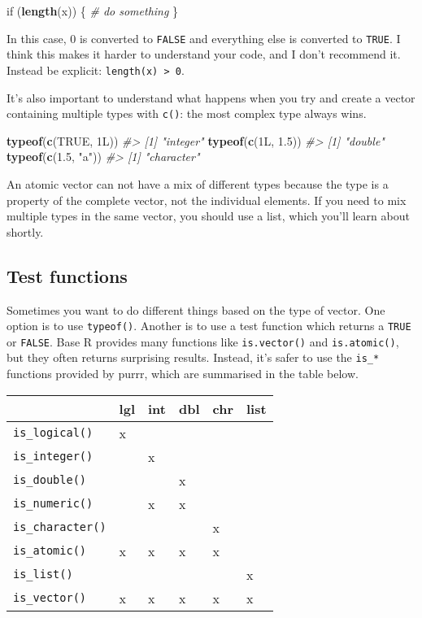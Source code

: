 \documentclass[]{book}
\newenvironment{Shaded}{\begin{snugshade}}{\end{snugshade}}
\newcommand{\KeywordTok}[1]{\textcolor[rgb]{0.13,0.29,0.53}{\textbf{{#1}}}}
\newcommand{\FloatTok}[1]{\textcolor[rgb]{0.00,0.00,0.81}{{#1}}}
\newcommand{\StringTok}[1]{\textcolor[rgb]{0.31,0.60,0.02}{{#1}}}
\newcommand{\CommentTok}[1]{\textcolor[rgb]{0.56,0.35,0.01}{\textit{{#1}}}}
\newcommand{\OtherTok}[1]{\textcolor[rgb]{0.56,0.35,0.01}{{#1}}}
\newcommand{\NormalTok}[1]{{#1}}
\begin{document}
\begin{Shaded}
\begin{Highlighting}[]
\NormalTok{if (}\KeywordTok{length}\NormalTok{(x)) \{}
  \CommentTok{# do something}
\NormalTok{\}}
\end{Highlighting}
\end{Shaded}

In this case, 0 is converted to \texttt{FALSE} and everything else is
converted to \texttt{TRUE}. I think this makes it harder to understand
your code, and I don't recommend it. Instead be explicit:
\texttt{length(x)\ \textgreater{}\ 0}.

It's also important to understand what happens when you try and create a
vector containing multiple types with \texttt{c()}: the most complex
type always wins.

\begin{Shaded}
\begin{Highlighting}[]
\KeywordTok{typeof}\NormalTok{(}\KeywordTok{c}\NormalTok{(}\OtherTok{TRUE}\NormalTok{, 1L))}
\CommentTok{#> [1] "integer"}
\KeywordTok{typeof}\NormalTok{(}\KeywordTok{c}\NormalTok{(1L, }\FloatTok{1.5}\NormalTok{))}
\CommentTok{#> [1] "double"}
\KeywordTok{typeof}\NormalTok{(}\KeywordTok{c}\NormalTok{(}\FloatTok{1.5}\NormalTok{, }\StringTok{"a"}\NormalTok{))}
\CommentTok{#> [1] "character"}
\end{Highlighting}
\end{Shaded}

An atomic vector can not have a mix of different types because the type
is a property of the complete vector, not the individual elements. If
you need to mix multiple types in the same vector, you should use a
list, which you'll learn about shortly.

\subsection{Test functions}\label{test-functions}

Sometimes you want to do different things based on the type of vector.
One option is to use \texttt{typeof()}. Another is to use a test
function which returns a \texttt{TRUE} or \texttt{FALSE}. Base R
provides many functions like \texttt{is.vector()} and
\texttt{is.atomic()}, but they often returns surprising results.
Instead, it's safer to use the \texttt{is\_*} functions provided by
purrr, which are summarised in the table below.

\begin{longtable}[]{@{}llllll@{}}
\toprule
& lgl & int & dbl & chr & list\tabularnewline
\midrule
\endhead
\texttt{is\_logical()} & x & & & &\tabularnewline
\texttt{is\_integer()} & & x & & &\tabularnewline
\texttt{is\_double()} & & & x & &\tabularnewline
\texttt{is\_numeric()} & & x & x & &\tabularnewline
\texttt{is\_character()} & & & & x &\tabularnewline
\texttt{is\_atomic()} & x & x & x & x &\tabularnewline
\texttt{is\_list()} & & & & & x\tabularnewline
\texttt{is\_vector()} & x & x & x & x & x\tabularnewline
\bottomrule
\end{longtable}
\end{document}
